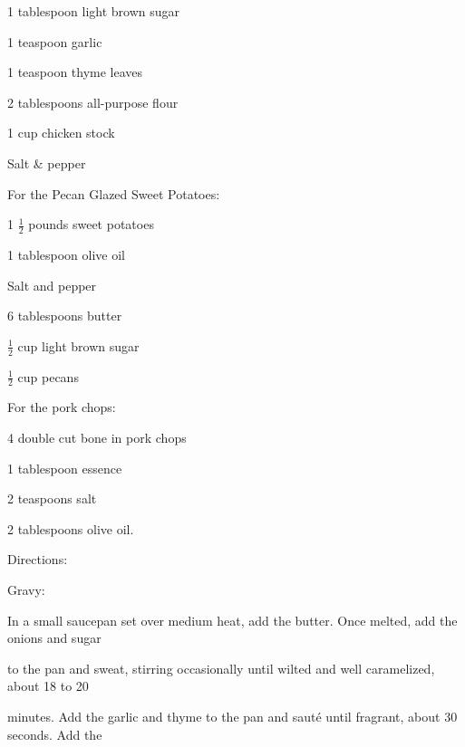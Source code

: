 \documentclass[a4paper,portrait,12pt]{book}
\begin{document}
1 tablespoon light brown sugar




1 teaspoon garlic




1 teaspoon thyme leaves




2 tablespoons all-purpose flour




1 cup chicken stock




Salt \& pepper




For the Pecan Glazed Sweet Potatoes:




1 $\frac{1}{2}$ pounds sweet potatoes




1 tablespoon olive oil




Salt and pepper




6 tablespoons butter




$\frac{1}{2}$ cup light brown sugar




$\frac{1}{2}$ cup pecans




For the pork chops:




4 double cut bone in pork chops




1 tablespoon essence




2 teaspoons salt




2 tablespoons olive oil.




Directions:

Gravy:




In a small saucepan set over medium heat, add the butter. Once melted, add the onions and sugar




to the pan and sweat, stirring occasionally until wilted and well caramelized, about 18 to 20




minutes. Add the garlic and thyme to the pan and saut\'{e} until fragrant, about 30 seconds. Add the
\end{document}
